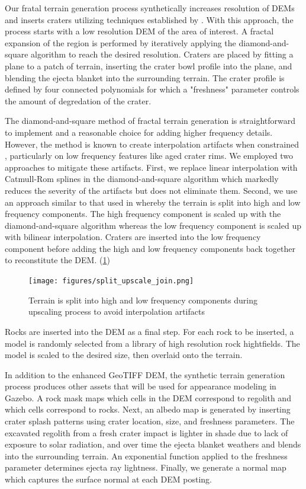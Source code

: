 \documentclass[twocolumn,letterpaper]{IEEEAerospaceCLS}  %
\begin{document}
Our fratal terrain generation process synthetically increases resolution of DEMs and inserts craters utilizing techniques established by \cite{parkes2004planet}. 
With this approach, the process starts with a low resolution DEM of the area of interest.
A fractal expansion of the region is performed by iteratively applying the diamond-and-square algorithm to reach the desired resolution. 
Craters are placed by fitting a plane to a patch of terrain, inserting the crater bowl profile into the plane, and blending the ejecta blanket into the surrounding terrain. 
The crater profile is defined by four connected polynomials for which a "freshness" parameter controls the amount of degredation of the crater. 

The diamond-and-square method of fractal terrain generation is straightforward to implement and a reasonable choice for adding higher frequency details. 
However, the method is known to create interpolation artifacts when constrained \cite{miller1986definition}, particularly on low frequency features like aged crater rims. 
We employed two approaches to mitigate these artifacts. 
First, we replace linear interpolation with Catmull-Rom splines in the diamond-and-square algorithm which markedly reduces the severity of the artifacts but does not eliminate them.
Second, we use an approach similar to that used in \cite{shankar2008lunar} whereby the terrain is split into high and low frequency components.
The high frequency component is scaled up with the diamond-and-square algorithm whereas the low frequency component is scaled up with bilinear interpolation. 
Craters are inserted into the low frequency component before adding the high and low frequency components back together to reconstitute the DEM. (\cref{fig:split_upscale_join})

\begin{figure}[h!]
  \texttt{[image: figures/split\_upscale\_join.png]}
    \caption{Terrain is split into high and low frequency components during upscaling process to avoid interpolation artifacts}
    \label{fig:split_upscale_join}
\end{figure}

Rocks are inserted into the DEM as a final step. For each rock to be inserted, a model is randomly selected from a library of high resolution rock hightfields. The model is scaled to the desired size, then overlaid onto the terrain.

In addition to the enhanced GeoTIFF DEM, the synthetic terrain generation process produces other assets that will be used for appearance modeling in Gazebo. 
A rock mask maps which cells in the DEM correspond to regolith and which cells correspond to rocks. 
Next, an albedo map is generated by inserting crater splash patterns using crater location, size, and freshness parameters. 
The excavated regolith from a fresh crater impact is lighter in shade due to lack of exposure to solar radiation, and over time the ejecta blanket weathers and blends into the surrounding terrain. 
An exponential function applied to the freshness parameter determines ejecta ray lightness. 
Finally, we generate a normal map which captures the surface normal at each DEM posting. 
\end{document}
